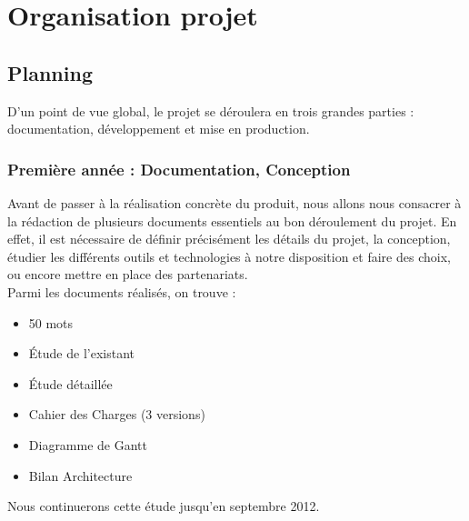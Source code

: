 \documentclass{life-fr}
\begin{document}
\chapter{Organisation projet}

\section{Planning}

D'un point de vue global, le projet se déroulera en trois grandes parties : documentation, développement et mise en production.\\

\subsection{ Première année : Documentation, Conception}

Avant de passer à la réalisation concrète du produit, nous allons nous consacrer à la rédaction de plusieurs documents essentiels au bon déroulement du projet. En effet, il est nécessaire de définir précisément les détails du projet, la conception, étudier les différents outils et technologies à notre disposition et faire des choix, ou encore mettre en place des partenariats.\\
Parmi les documents réalisés, on trouve :

\begin{itemize}
  \item 50 mots
  \item Étude de l'existant
  \item Étude détaillée
  \item Cahier des Charges (3 versions)
  \item Diagramme de Gantt
  \item Bilan Architecture
\end{itemize}

Nous continuerons cette étude jusqu'en septembre 2012.\\

\newpage
\end{document}
